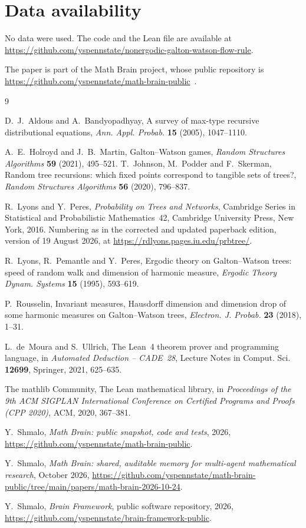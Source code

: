 \documentclass[11pt]{amsart}
\theoremstyle{remark}
\numberwithin{equation}{section}
\begin{document}
\section*{Data availability}
No data were used. The code and the Lean file are available at\\ \url{https://github.com/yspennstate/nonergodic-galton-watson-flow-rule}.

The paper is part of the Math Brain project, whose public repository is \url{https://github.com/yspennstate/math-brain-public}~\cite{MathBrainRepo}.

\begin{thebibliography}{9}

D.~J.~Aldous and A.~Bandyopadhyay, A survey of max-type recursive distributional equations, \emph{Ann. Appl. Probab.} \textbf{15} (2005), 1047--1110.

A.~E.~Holroyd and J.~B.~Martin, Galton--Watson games, \emph{Random Structures Algorithms} \textbf{59} (2021), 495--521.
T.~Johnson, M.~Podder and F.~Skerman, Random tree recursions: which fixed points correspond to tangible sets of trees?, \emph{Random Structures Algorithms} \textbf{56} (2020), 796--837.

R.~Lyons and Y.~Peres, \emph{Probability on Trees and Networks}, Cambridge Series in Statistical and Probabilistic Mathematics~42, Cambridge University Press, New York, 2016. Numbering as in the corrected and updated paperback edition, version of 19 August 2026, at \url{https://rdlyons.pages.iu.edu/prbtree/}.

R.~Lyons, R.~Pemantle and Y.~Peres, Ergodic theory on Galton--Watson trees: speed of random walk and dimension of harmonic measure, \emph{Ergodic Theory Dynam. Systems} \textbf{15} (1995), 593--619.

P.~Rousselin, Invariant measures, Hausdorff dimension and dimension drop of some harmonic measures on Galton--Watson trees, \emph{Electron. J. Probab.} \textbf{23} (2018), 1--31.

L.~de~Moura and S.~Ullrich, The Lean~4 theorem prover and programming language, in \emph{Automated Deduction -- CADE~28}, Lecture Notes in Comput. Sci. \textbf{12699}, Springer, 2021, 625--635.

The mathlib Community, The Lean mathematical library, in \emph{Proceedings of the 9th ACM SIGPLAN International Conference on Certified Programs and Proofs (CPP 2020)}, ACM, 2020, 367--381.

 Y.~Shmalo, \emph{Math Brain: public snapshot, code and tests}, 2026, \url{https://github.com/yspennstate/math-brain-public}.

 Y.~Shmalo, \emph{Math Brain: shared, auditable memory for multi-agent mathematical research}, October 2026, \url{https://github.com/yspennstate/math-brain-public/tree/main/papers/math-brain-2026-10-24}.

 Y.~Shmalo, \emph{Brain Framework}, public software repository, 2026, \url{https://github.com/yspennstate/brain-framework-public}.

\end{thebibliography}
\end{document}
